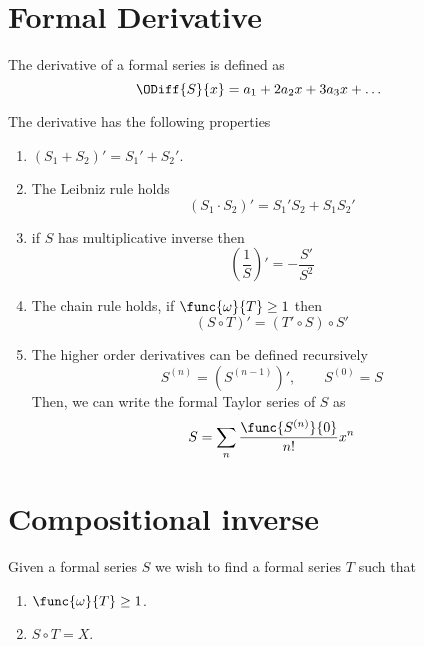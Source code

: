 \section{Formal Derivative}
The derivative of a formal series is defined as 
\begin{equation*}
    \ODiff{S}{x} = a_1 + 2a_2 x + 3a_3 x + \dots 
\end{equation*}
\begin{proposition}
    The derivative has the following properties
    \begin{enumerate}
        \item \((S_1 + S_2)' = S_1' + S_2'\).
        \item The Leibniz rule holds 
        \begin{equation*}
            (S_1 \cdot S_2)' = S_1' S_2 + S_1 S_2'
        \end{equation*}
        \item if \(S\) has multiplicative inverse then 
        \begin{equation*}
            \left(\dfrac{1}{S}\right)' = - \dfrac{S'}{S^2}
        \end{equation*}
        \item The chain rule holds, if \(\func{\omega}{T} \geq 1\) then 
        \begin{equation*}
            (S \circ T)' = (T' \circ S) \circ S'
        \end{equation*}
        \item The higher order derivatives can be defined recursively 
        \begin{equation*}
            S^{(n)} = (S^{(n-1)})', \qquad S^{(0)} = S
        \end{equation*}
        Then, we can write the formal Taylor series of \(S\) as 
        \begin{equation*}
            S = \sum_n \dfrac{\func{S^{(n)}}{0}}{n!} x^n
        \end{equation*}
    \end{enumerate}
\end{proposition}

\section{Compositional inverse}
Given a formal series \(S\) we wish to find a formal series \(T\) such that 
\begin{enumerate}
    \item \(\func{\omega}{T} \geq 1\).
    \item \( S \circ T = X\).
\end{enumerate}

